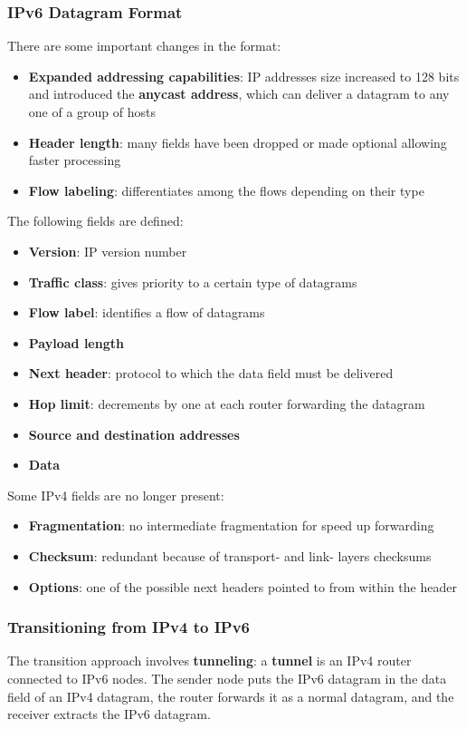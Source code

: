 \documentclass{article}
\begin{document}
\subsubsection*{IPv6 Datagram Format}
There are some important changes in the format:
\begin{itemize}
    \item \textbf{Expanded addressing capabilities}: IP addresses size increased to 128 bits and introduced the \textbf{anycast address}, which can deliver a datagram to any one of a group of hosts
    \item \textbf{Header length}: many fields have been dropped or made optional allowing faster processing
    \item \textbf{Flow labeling}: differentiates among the flows depending on their type
\end{itemize}
The following fields are defined:
\begin{itemize}
    \item \textbf{Version}: IP version number
    \item \textbf{Traffic class}: gives priority to a certain type of datagrams 
    \item \textbf{Flow label}: identifies a flow of datagrams
    \item \textbf{Payload length}
    \item \textbf{Next header}: protocol to which the data field must be delivered
    \item \textbf{Hop limit}: decrements by one at each router forwarding the datagram
    \item \textbf{Source and destination addresses}
    \item \textbf{Data}
\end{itemize}
Some IPv4 fields are no longer present:
\begin{itemize}
    \item \textbf{Fragmentation}: no intermediate fragmentation for speed up forwarding
    \item \textbf{Checksum}: redundant because of transport- and link- layers checksums
    \item \textbf{Options}: one of the possible next headers pointed to from within the header
\end{itemize}
\subsubsection{Transitioning from IPv4 to IPv6}
The transition approach involves \textbf{tunneling}: a \textbf{tunnel} is an IPv4 router connected to IPv6 nodes. The sender node puts the IPv6 datagram in the data field of an IPv4 datagram, the router forwards it as a normal datagram, and the receiver extracts the IPv6 datagram.
\end{document}
